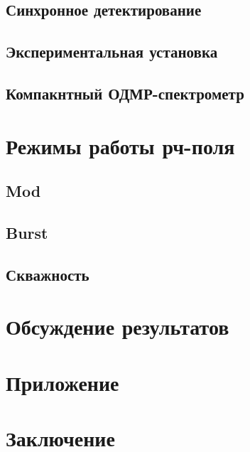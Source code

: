 \documentclass[a4paper,12pt]{article}
\begin{document}
\subsection{Синхронное детектирование}



\subsection{Экспериментальная установка}



\subsection{Компакнтный ОДМР-спектрометр}


\section{Режимы работы рч-поля}



\subsection{Mod}



\subsection{Burst}



\subsection{Скважность}



\section{Обсуждение результатов}



\section{Приложение}



\section{Заключение}
\end{document}

